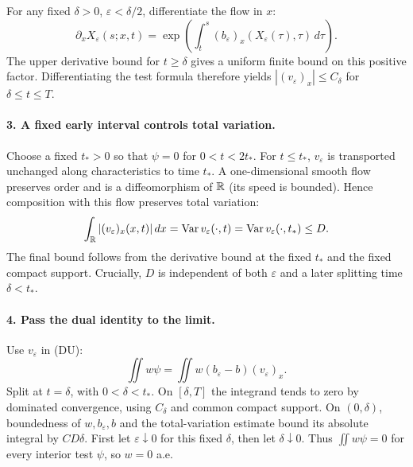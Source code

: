 \begin{expandedproof}
For any fixed $\delta>0$, $\varepsilon<\delta/2$,
differentiate the flow in $x$:
\[
 \partial_xX_\varepsilon(s;x,t)
 =\exp\left(\int_t^s(b_\varepsilon)_x(X_\varepsilon(\tau),\tau)\,d\tau\right).
\]
The upper derivative bound for $t\geq\delta$ gives a uniform finite
bound on this positive factor.
Differentiating the test formula therefore yields
$|(v_\varepsilon)_x|\leq C_\delta$ for $\delta\leq t\leq T$.

\Needspace{45mm}
\paragraph{3. A fixed early interval controls total variation.}
Choose a fixed $t_*>0$ so that $\psi=0$ for $0<t<2t_*$.
For $t\leq t_*$, $v_\varepsilon$ is transported unchanged along
characteristics to time $t_*$.
A one-dimensional smooth flow preserves order and is a diffeomorphism
of $\mathbb{R}$ (its speed is bounded). Hence composition with this flow
preserves total variation:
\[
 \int_{\mathbb{R}}|(v_\varepsilon)_x(x,t)|\,dx
 =\operatorname{Var}v_\varepsilon(\cdot,t)
 =\operatorname{Var}v_\varepsilon(\cdot,t_*)\leq D.
\]
The final bound follows from the derivative bound at the fixed $t_*$
and the fixed compact support. Crucially, $D$ is independent of both
$\varepsilon$ and a later splitting time $\delta<t_*$.

\paragraph{4. Pass the dual identity to the limit.}
Use $v_\varepsilon$ in (DU):
\[
 \iint w\psi=\iint w(b_\varepsilon-b)(v_\varepsilon)_x.
\]
Split at $t=\delta$, with $0<\delta<t_*$.
On $[\delta,T]$ the integrand tends to zero by dominated convergence,
using $C_\delta$ and common compact support.
On $(0,\delta)$, boundedness of $w,b_\varepsilon,b$ and the
total-variation estimate bound its absolute integral by $C D\delta$.
First let $\varepsilon\downarrow0$ for this fixed $\delta$,
then let $\delta\downarrow0$.
Thus $\iint w\psi=0$ for every interior test $\psi$, so $w=0$ a.e.
\end{expandedproof}
\Needspace{45mm}
